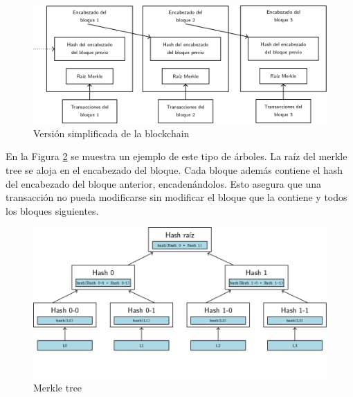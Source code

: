 \begin{figure}[h]
  \centering
  \includegraphics[scale=0.4]{figures/blockchain.png}
  \caption{Versión simplificada de la blockchain}
  \label{fig:blockchain}
\end{figure}


En la Figura \ref{fig:merkle-tree} se muestra un ejemplo de este tipo de árboles.
La raíz del merkle tree se aloja en el encabezado del bloque. Cada bloque además contiene el hash del encabezado
del bloque anterior, encadenándolos. Esto asegura que una transacción no pueda modificarse sin modificar el bloque
que la contiene y todos los bloques siguientes.~\cite{bitcoin}

\begin{figure}[h]
  \centering
  \includegraphics[scale=0.4]{figures/merkle-tree.png}
  \caption{Merkle tree}
  \label{fig:merkle-tree}
\end{figure}


